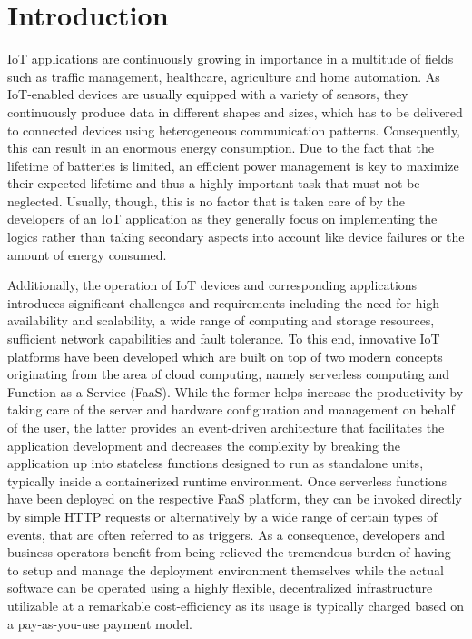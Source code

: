 
\chapter{Introduction}\label{chapter:introduction}
IoT applications are continuously growing in importance in a multitude of fields such as traffic management, healthcare, agriculture and home automation. As IoT-enabled devices are usually equipped with a variety of sensors, they continuously produce data in different shapes and sizes, which has to be delivered to connected devices using heterogeneous communication patterns. Consequently, this can result in an enormous energy consumption. Due to the fact that the lifetime of batteries is limited, an efficient power management is key to maximize their expected lifetime and thus a highly important task that must not be neglected. Usually, though, this is no factor that is taken care of by the developers of an IoT application as they generally focus on implementing the logics rather than taking secondary aspects into account like device failures or the amount of energy consumed.

Additionally, the operation of IoT devices and corresponding applications introduces significant challenges and requirements including the need for high availability and scalability, a wide range of computing and storage resources, sufficient network capabilities and fault tolerance. To this end, innovative IoT platforms have been developed which are built on top of two modern concepts originating from the area of cloud computing, namely serverless computing and Function-as-a-Service (FaaS). While the former helps increase the productivity by taking care of the server and hardware configuration and management on behalf of the user, the latter provides an event-driven architecture that facilitates the application development and decreases the complexity by breaking the application up into stateless functions designed to run as standalone units, typically inside a containerized runtime environment. Once serverless functions have been deployed on the respective FaaS platform, they can be invoked directly by simple HTTP requests or alternatively by a wide range of certain types of events, that are often referred to as triggers. As a consequence, developers and business operators benefit from being relieved the tremendous burden of having to setup and manage the deployment environment themselves while the actual software can be operated using a highly flexible, decentralized infrastructure utilizable at a remarkable cost-efficiency as its usage is typically charged based on a pay-as-you-use payment model.

